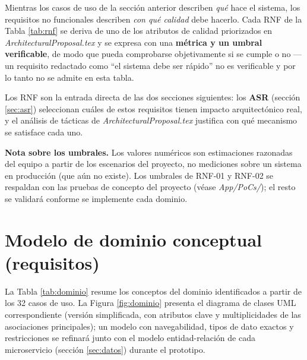 \documentclass[11pt,a4paper]{article}
\begin{document}
Mientras los casos de uso de la sección anterior describen \textit{qué} hace el sistema, los
requisitos no funcionales describen \textit{con qué calidad} debe hacerlo. Cada RNF de la Tabla
\ref{tab:rnf} se deriva de uno de los atributos de calidad priorizados en
\textit{ArchitecturalProposal.tex} y se expresa con una \textbf{métrica y un umbral verificable},
de modo que pueda comprobarse objetivamente si se cumple o no --- un requisito redactado como
``el sistema debe ser rápido'' no es verificable y por lo tanto no se admite en esta tabla.

Los RNF son la entrada directa de las dos secciones siguientes: los
\textbf{ASR} (sección \ref{sec:asr}) seleccionan cuáles de estos requisitos tienen impacto
arquitectónico real, y el análisis de tácticas de \textit{ArchitecturalProposal.tex} justifica
con qué mecanismo se satisface cada uno.

\textbf{Nota sobre los umbrales.} Los valores numéricos son estimaciones razonadas del equipo a
partir de los escenarios del proyecto, no mediciones sobre un sistema en producción (que aún no
existe). Los umbrales de RNF-01 y RNF-02 se respaldan con las pruebas de concepto del proyecto
(véase \textit{App/PoCs/}); el resto se validará conforme se implemente cada dominio.



\section{Modelo de dominio conceptual (requisitos)}
\label{sec:dominio}

La Tabla \ref{tab:dominio} resume los conceptos del dominio identificados a partir de los 32
casos de uso. La Figura \ref{fig:dominio} presenta el diagrama de clases UML correspondiente
(versión simplificada, con atributos clave y multiplicidades de las asociaciones principales);
un modelo con navegabilidad, tipos de dato exactos y restricciones se refinará junto con el
modelo entidad-relación de cada microservicio (sección \ref{sec:datos}) durante el prototipo.
\end{document}
